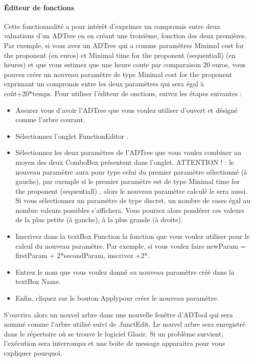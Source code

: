 \paragraph{Éditeur de fonctions}Cette fonctionnalité a pour intérêt d'exprimer un compromis entre deux valuations d'un ADTree en en créant une troisième, fonction des deux premières. Par exemple, si vous avez un ADTree qui a comme paramètres \og Minimal cost for the proponent \fg (en euros) et \og Minimal time for the proponent (sequentiall) \fg (en heures) et que vous estimez que une heure \og coute \fg par comparaison 20 euros, vous pouvez créer un nouveau paramètre de type \og Minimal cost for the proponent \fg exprimant un compromis entre les deux paramètres qui sera égal à coût+20*temps.
Pour utiliser l'éditeur de onctions, suivez les étapes suivantes : 
\begin{itemize}
\item Assurer vous d'avoir l'ADTree que vous voulez utiliser d'ouvert et désigné comme l'arbre courant. 
\item Sélectionnez l'onglet \og FunctionEditor \fg .
\item Sélectionnez les deux paramètres de l'ADTree que vous voulez combiner au moyen des deux ComboBox présentent dans l'onglet. ATTENTION  ! : le nouveau paramètre aura pour type celui du premier paramètre sélectionné (à gauche), par exemple si le premier paramètre est de type \og Minimal time for the proponent (sequentiall) \fg , alors le nouveau paramètre calculé le sera aussi. Si vous sélectionnez un paramètre de type discret, un nombre de cases égal au nombre valeurs possibles s'affichera. Vous pourrez alors pondérer ces valeurs de la plus petite (à gauche), à la plus grande (à droite).
\item Inscrivez dans la textBox \og Function \fg la fonction que vous voulez utiliser pour le calcul du nouveau paramètre. Par exemple, si vous voulez faire \og newParam = firstParam + 2*secondParam\fg , inscrivez \og +2*\fg .
\item Entrez le nom que vous voulez donné au nouveau paramètre créé dans la textBox \og Name\fg.
\item Enfin, cliquez sur le bouton \og Apply\fg pour créer le nouveau paramètre.
\end{itemize} 
S'ouvrira alors un nouvel arbre dans une nouvelle fenêtre d'ADTool qui sera nommé comme l'arbre utilisé suivi de \og .functEdit\fg . Le nouvel arbre sera enregistré dans le répertoire où se trouve le logiciel Glasir. 
Si un problème survient, l'exécution sera interrompu et une boite de message apparaitra pour vous expliquer pourquoi.

